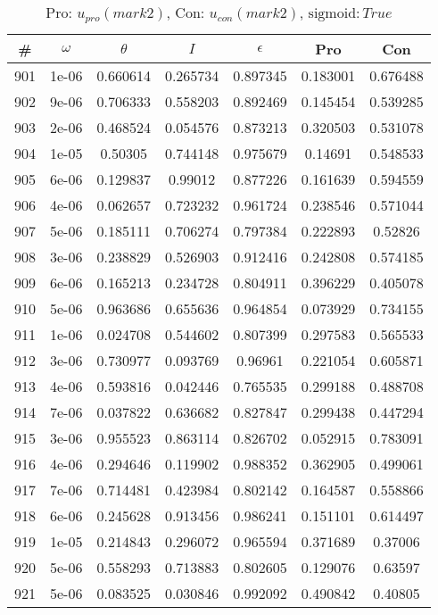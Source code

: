 \newpage
\begin{table}
\caption{Pro: $u_{pro} (mark 2)$, Con: $u_{con} (mark 2)$, $\mathrm{sigmoid}: True$}
\begin{tabular*}{\linewidth}{c|c|c|c|c|c|c}
\# & $\omega$ & $\theta$ & $I$ & $\epsilon$ & Pro & Con \\
\hline
901 & 1e-06 & 0.660614 & 0.265734 & 0.897345 & 0.183001 & 0.676488\\
902 & 9e-06 & 0.706333 & 0.558203 & 0.892469 & 0.145454 & 0.539285\\
903 & 2e-06 & 0.468524 & 0.054576 & 0.873213 & 0.320503 & 0.531078\\
904 & 1e-05 & 0.50305 & 0.744148 & 0.975679 & 0.14691 & 0.548533\\
905 & 6e-06 & 0.129837 & 0.99012 & 0.877226 & 0.161639 & 0.594559\\
906 & 4e-06 & 0.062657 & 0.723232 & 0.961724 & 0.238546 & 0.571044\\
907 & 5e-06 & 0.185111 & 0.706274 & 0.797384 & 0.222893 & 0.52826\\
908 & 3e-06 & 0.238829 & 0.526903 & 0.912416 & 0.242808 & 0.574185\\
909 & 6e-06 & 0.165213 & 0.234728 & 0.804911 & 0.396229 & 0.405078\\
910 & 5e-06 & 0.963686 & 0.655636 & 0.964854 & 0.073929 & 0.734155\\
911 & 1e-06 & 0.024708 & 0.544602 & 0.807399 & 0.297583 & 0.565533\\
912 & 3e-06 & 0.730977 & 0.093769 & 0.96961 & 0.221054 & 0.605871\\
913 & 4e-06 & 0.593816 & 0.042446 & 0.765535 & 0.299188 & 0.488708\\
914 & 7e-06 & 0.037822 & 0.636682 & 0.827847 & 0.299438 & 0.447294\\
915 & 3e-06 & 0.955523 & 0.863114 & 0.826702 & 0.052915 & 0.783091\\
916 & 4e-06 & 0.294646 & 0.119902 & 0.988352 & 0.362905 & 0.499061\\
917 & 7e-06 & 0.714481 & 0.423984 & 0.802142 & 0.164587 & 0.558866\\
918 & 6e-06 & 0.245628 & 0.913456 & 0.986241 & 0.151101 & 0.614497\\
919 & 1e-05 & 0.214843 & 0.296072 & 0.965594 & 0.371689 & 0.37006\\
920 & 5e-06 & 0.558293 & 0.713883 & 0.802605 & 0.129076 & 0.63597\\
921 & 5e-06 & 0.083525 & 0.030846 & 0.992092 & 0.490842 & 0.40805\\

\end{tabular*}
\end{table}
